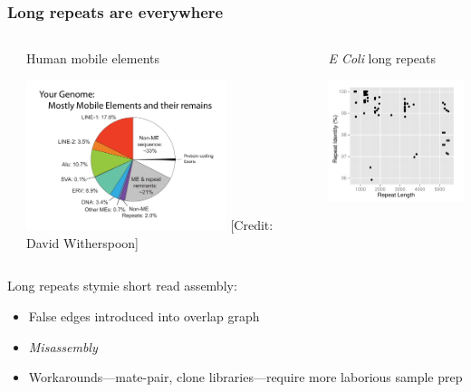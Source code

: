 \documentclass[serif,11pt]{beamer}
\begin{document}
\begin{frame}
\frametitle{Long repeats are everywhere}
\label{sec-4-4}
\begin{columns} %
\label{sec-4-4-1}
\begin{column}{0.5\textwidth}
\begin{block}{Human mobile elements}
\label{sec-4-4-1-1}

    \vspace{0.2in}
    \includegraphics[width=2.3in]{img/witherspoon-mobile-elements.pdf}
    \newline
    \tiny [Credit: David Witherspoon]
\end{block}
\end{column}
\begin{column}{0.5\textwidth}
\begin{block}{\emph{E Coli} long repeats}
\label{sec-4-4-1-2}

     \includegraphics[width=2in]{img/ecoli-repeats.pdf}
\end{block}
\end{column}
\end{columns}
\label{sec-4-4-2}

    Long repeats stymie short read assembly:
\begin{itemize}
\item False edges introduced into overlap graph
\item \emph{Misassembly}
\item Workarounds---mate-pair, clone libraries---require more laborious sample prep
\end{itemize}
\end{frame}
\end{document}
